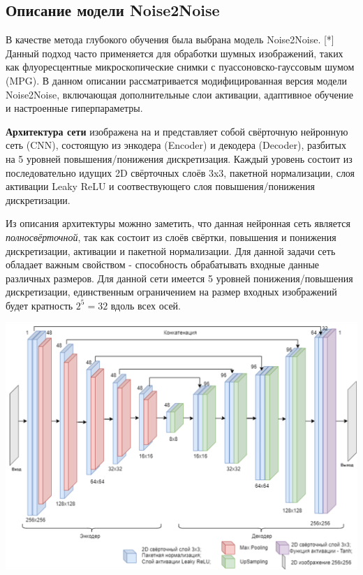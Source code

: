\subsection{Описание модели Noise2Noise}
\par В качестве метода глубокого обучения была выбрана модель Noise2Noise. [*] Данный подход часто применяется для обработки шумных изображений, таких как флуоресцентные микроскопические снимки с пуассоновско-гауссовым шумом (MPG). В данном описании рассматривается модифицированная версия модели Noise2Noise, включающая дополнительные слои активации, адаптивное обучение и настроенные гиперпараметры. 
\par \textbf{Архитектура сети} изображена на  и представляет собой свёрточную нейронную сеть (CNN), состоящую из энкодера (Encoder) и декодера (Decoder), разбитых на 5 уровней повышения/понижения дискретизация. Каждый уровень состоит из последовательно идущих 2D свёрточных слоёв 3x3, пакетной нормализации, слоя активации Leaky ReLU и соотвествующего слоя повышения/понижения дискретизации.
\par Из описания архитектуры можнно заметить, что данная нейронная сеть является \textit{полносвёрточной}, так как состоит из слоёв свёртки, повышения и понижения дискретизации, активации и пакетной нормализации. Для данной задачи сеть обладает важным свойством - способность обрабатывать входные данные различных размеров. Для данной сети имеется 5 уровней понижения/повышения дискретизации, единственным ограничением на размер входных изображений будет кратность $2^5 = 32$ вдоль всех осей.
\begin{minipage}{\textwidth}
	\centering
	\vspace{\mfloatsep} %
	\includegraphics[keepaspectratio=true,scale=0.47] {my_folder/images/denoising/n2n_architecture.png}
	\label{fig:noise2noise}  
	\vspace{\mfloatsep} %
\end{minipage}
